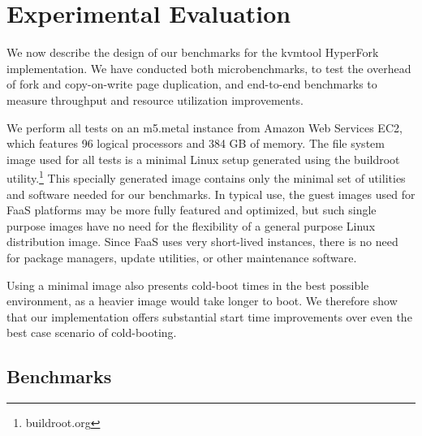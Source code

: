 \section{Experimental Evaluation} \label{sec:experiments} We now describe the
design of our benchmarks for the kvmtool HyperFork implementation. We have
conducted both microbenchmarks, to test the overhead of fork and copy-on-write
page duplication, and end-to-end benchmarks to measure throughput and resource
utilization improvements.

We perform all tests on an m5.metal instance from Amazon Web Services EC2,
which features 96 logical processors and 384 GB of memory. The file system
image used for all tests is a minimal Linux setup generated using the buildroot
utility.\footnote{buildroot.org} This specially generated image contains only
the minimal set of utilities and software needed for our benchmarks. In typical
use, the guest images used for FaaS platforms may be more fully featured and
optimized, but such single purpose images have no need for the flexibility of a
general purpose Linux distribution image. Since FaaS uses very short-lived
instances, there is no need for package managers, update utilities, or other
maintenance software.

Using a minimal image also presents cold-boot times in the best possible
environment, as a heavier image would take longer to boot. We therefore show
that our implementation offers substantial start time improvements over even
the best case scenario of cold-booting.

\subsection{Benchmarks}


